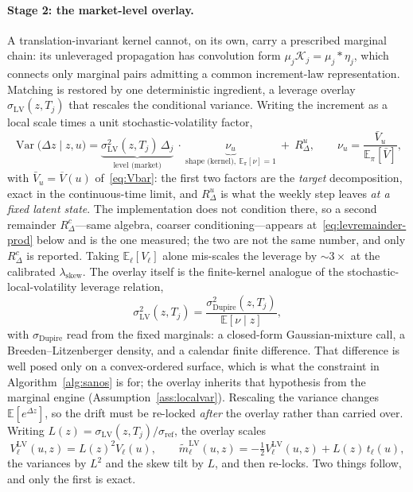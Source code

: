 \documentclass[11pt]{article}
\newcommand{\E}{\mathbb{E}}
\newcommand{\Var}{\operatorname{Var}}
\newcommand{\cK}{\mathcal{K}}
\providecommand{\1}{\mathbf 1}
\begin{document}
\paragraph{Stage 2: the market-level overlay.} A translation-invariant kernel cannot, on its own,
carry a prescribed marginal chain: its unleveraged propagation has convolution form
$\mu_j\cK_j=\mu_j\ast\eta_j$, which connects only marginal pairs admitting a common increment-law
representation. Matching is restored by one deterministic ingredient, a leverage overlay
$\sigma_{\mathrm{LV}}(z,T_j)$ that rescales the conditional variance. Writing the increment as a
local scale times a unit stochastic-volatility factor,
\begin{equation}
\Var\!\big(\Delta z\mid z,u\big)
=\underbrace{\sigma_{\mathrm{LV}}^2(z,T_j)\,\Delta_j}_{\text{level (market)}}\ \cdot\
\underbrace{\nu_u}_{\text{shape (kernel)},\ \E_\pi[\nu]=1}
\ +\ R^{u}_\Delta,
\qquad
\nu_u=\frac{\bar V_u}{\E_\pi[\bar V]},
\label{eq:decouple}
\end{equation}
with $\bar V_u=\overline V(u)$ of~\eqref{eq:Vbar}: the first two factors are the \emph{target}
decomposition, exact in the continuous-time limit, and $R^{u}_\Delta$ is what the weekly step leaves
\emph{at a fixed latent state}. The implementation does not condition there, so a second remainder
$R^{c}_\Delta$---same algebra, coarser conditioning---appears at~\eqref{eq:levremainder-prod} below
and is the one measured; the two are not the same number, and only $R^{c}_\Delta$ is reported.
Taking $\E_\ell[V_\ell]$ alone mis-scales the leverage by $\sim3\times$ at the calibrated
$\lambda_{\mathrm{skew}}$. The overlay itself is the finite-kernel analogue of the
stochastic-local-volatility leverage relation,
\begin{equation}
\sigma_{\mathrm{LV}}^2(z,T_j)=\frac{\sigma_{\mathrm{Dupire}}^2(z,T_j)}{\E[\nu\mid z]},
\label{eq:gyongy}
\end{equation}
with $\sigma_{\mathrm{Dupire}}$ read from the fixed marginals: a closed-form Gaussian-mixture
call, a Breeden--Litzenberger density, and a calendar finite difference. That difference is well
posed only on a convex-ordered surface, which is what the constraint in Algorithm~\ref{alg:sanos}
is for; the overlay inherits that hypothesis from the marginal engine
(Assumption~\ref{ass:localvar}). Rescaling the variance changes $\E[e^{\Delta z}]$, so the drift
must be re-locked \emph{after} the overlay rather than carried over. Writing
$L(z)=\sigma_{\mathrm{LV}}(z,T_j)/\sigma_{\mathrm{ref}}$, the overlay scales
\begin{equation}
V^{\mathrm{LV}}_{\ell}(u,z)=L(z)^2V_\ell(u),
\qquad
\widetilde m^{\mathrm{LV}}_{\ell}(u,z)=-\tfrac12V^{\mathrm{LV}}_{\ell}(u,z)+L(z)\,t_\ell(u),
\label{eq:relock-lv}
\end{equation}
the variances by $L^2$ and the skew tilt by $L$, and then re-locks. Two things follow, and only the
first is exact.
\end{document}
